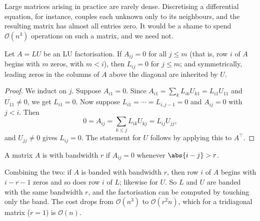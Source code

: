Large matrices arising in practice are rarely dense. Discretising a differential equation, for instance, couples each unknown only to its neighbours, and the resulting matrix has almost all entries zero. It would be a shame to spend $\mathcal{O}(n^3)$ operations on such a matrix, and we need not.

\begin{theorem}\label{thm:inherit}
  Let $A = LU$ be an LU factorisation. If $A_{ij} = 0$ for all $j \le m$ (that is, row $i$ of $A$ begins with $m$ zeros, with $m < i$), then $L_{ij} = 0$ for $j \le m$; and symmetrically, leading zeros in the columns of $A$ above the diagonal are inherited by $U$.
\end{theorem}
\begin{proof}
  We induct on $j$. Suppose $A_{i1} = 0$. Since $A_{i1} = \sum_k L_{ik}U_{k1} = L_{i1}U_{11}$ and $U_{11}\neq 0$, we get $L_{i1} = 0$. Now suppose $L_{i1} = \cdots = L_{i,j-1} = 0$ and $A_{ij} = 0$ with $j < i$. Then
  $$
  0 = A_{ij} = \sum_{k\leq j}L_{ik}U_{kj} = L_{ij}U_{jj},
  $$
  and $U_{jj}\neq 0$ gives $L_{ij} = 0$. The statement for $U$ follows by applying this to $A^\top$.
\end{proof}

\begin{definition}
  A matrix $A$ is  with bandwidth $r$ if $A_{ij} = 0$ whenever $\abs{i-j} > r$.
\end{definition}

Combining the two: if $A$ is banded with bandwidth $r$, then row $i$ of $A$ begins with $i - r - 1$ zeros and so does row $i$ of $L$; likewise for $U$. So $L$ and $U$ are banded with the same bandwidth $r$, and the factorisation can be computed by touching only the band. The cost drops from $\mathcal{O}(n^3)$ to $\mathcal{O}(r^2 n)$, which for a tridiagonal matrix ($r=1$) is $\mathcal{O}(n)$.

